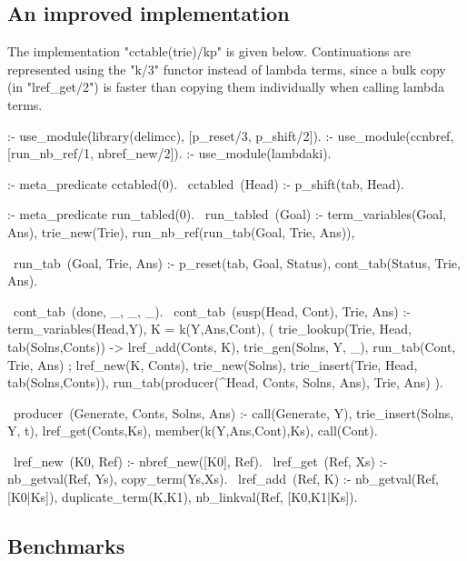 \subsection{An improved implementation}

The implementation "cctable(trie)/kp" is given below. Continuations are represented using
the "k/3" functor instead of lambda terms, since a bulk copy (in "lref_get/2") is faster
than copying them individually when calling lambda terms. 
\begin{prolog-framed}[name=cctable_trie_kp,numbers=left]
  :- use_module(library(delimcc), [p_reset/3, p_shift/2]).
  :- use_module(ccnbref, [run_nb_ref/1, nbref_new/2]).
  :- use_module(lambdaki).
        
  :- meta_predicate cctabled(0). 
  ~cctabled~(Head) :- p_shift(tab, Head).

  :- meta_predicate run_tabled(0). 
  ~run_tabled~(Goal) :-
     term_variables(Goal, Ans), trie_new(Trie),
     run_nb_ref(run_tab(Goal, Trie, Ans)),

  ~run_tab~(Goal, Trie, Ans) :-
     p_reset(tab, Goal, Status),
     cont_tab(Status, Trie, Ans).

  ~cont_tab~(done, _, _, _).
  ~cont_tab~(susp(Head, Cont), Trie, Ans) :-  
     term_variables(Head,Y), K = k(Y,Ans,Cont),
     (  trie_lookup(Trie, Head, tab(Solns,Conts))
     -> lref_add(Conts, K),
        trie_gen(Solns, Y, _),
        run_tab(Cont, Trie, Ans)
     ;  lref_new(K, Conts),
        trie_new(Solns),
        trie_insert(Trie, Head, tab(Solns,Conts)),
        run_tab(producer(\Y^Head, Conts, Solns, Ans), Trie, Ans)
     ).

  ~producer~(Generate, Conts, Solns, Ans) :-
     call(Generate, Y),
     trie_insert(Solns, Y, t),
     lref_get(Conts,Ks), member(k(Y,Ans,Cont),Ks),
     call(Cont).

  ~lref_new~(K0, Ref) :- nbref_new([K0], Ref).
  ~lref_get~(Ref, Xs) :- nb_getval(Ref, Ys), copy_term(Ys,Xs).
  ~lref_add~(Ref, K) :- 
    nb_getval(Ref, [K0|Ks]), duplicate_term(K,K1), 
    nb_linkval(Ref, [K0,K1|Ks]).
\end{prolog-framed}

\subsection{Benchmarks}

